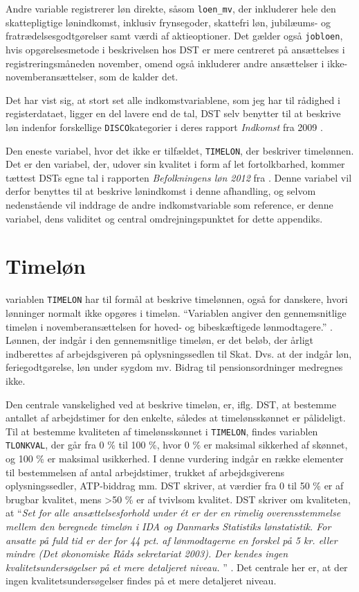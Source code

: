 Andre variable registrerer løn direkte, såsom \texttt{loen\_mv}, der inkluderer hele den skattepligtige lønindkomst, inklusiv frynsegoder, skattefri løn, jubilæums- og fratrædelsesgodtgørelser samt værdi af aktieoptioner. Det gælder også \texttt{jobloen}, hvis opgørelsesmetode i beskrivelsen hos DST er mere centreret på ansættelses i registreringsmåneden november, omend også inkluderer andre ansættelser i ikke-novemberansættelser, som de kalder det. \label{indkomstvariable}

Det har vist sig, at stort set alle indkomstvariablene, som jeg har til rådighed i registerdataet, ligger en del lavere end de tal, DST selv benytter til at beskrive løn indenfor forskellige \texttt{DISCO}kategorier i deres rapport \emph{Indkomst} fra 2009  \textcite{DST2009}.  

Den eneste variabel, hvor det ikke er tilfældet, \texttt{TIMELON}, der beskriver timelønnen. Det er den variabel, der, udover sin kvalitet i form af let fortolkbarhed, kommer tættest DSTs egne tal i rapporten \emph{Befolkningens løn 2012}  fra \citeyear{DST2012b}. Denne variabel vil derfor benyttes til at beskrive lønindkomst i denne afhandling, og selvom nedenstående vil inddrage de andre indkomstvariable som reference, er denne variabel, dens validitet og central omdrejningspunktet for dette appendiks. 

\section{Timeløn \label{}}

variablen \texttt{TIMELON} har til formål at beskrive timelønnen, også for danskere, hvori lønninger normalt ikke opgøres i timeløn. “Variablen angiver den gennemsnitlige timeløn i novemberansættelsen for hoved- og bibeskæftigede lønmodtagere.” \parencite{DST-TIMELON}. Lønnen, der indgår i den gennemsnitlige timeløn, er det beløb, der årligt indberettes af arbejdsgiveren på oplysningssedlen til Skat. Dvs. at der indgår løn, feriegodtgørelse, løn under sygdom mv. Bidrag til pensionsordninger medregnes ikke. 

Den centrale vanskelighed ved at beskrive timeløn, er, iflg. DST, at bestemme antallet af arbejdstimer for den enkelte, således at timelønsskønnet er pålideligt. Til at bestemme kvaliteten af timelønsskønnet i \texttt{TIMELON}, findes variablen \texttt{TLONKVAL}, der går fra 0 \% til 100 \%, hvor 0 \% er maksimal sikkerhed af skønnet, og 100 \% er maksimal usikkerhed. I denne vurdering indgår en række elementer til bestemmelsen af antal arbejdstimer, trukket af arbejdsgiverens oplysningssedler, ATP-biddrag mm. DST skriver, at værdier fra 0 til 50 \% er af brugbar kvalitet, mens >50 \% er af tvivlsom kvalitet. DST skriver om kvaliteten, at “\emph{Set for alle ansættelsesforhold under ét er der en rimelig overensstemmelse mellem den beregnede timeløn i IDA og Danmarks Statistiks lønstatistik. For ansatte på fuld tid er der for 44 pct. af lønmodtagerne en forskel på 5 kr. eller mindre (Det økonomiske Råds sekretariat 2003). Der kendes ingen kvalitetsundersøgelser på et mere detaljeret niveau. }” \parencite{DST-TIMELON}. Det centrale her er, at der ingen kvalitetsundersøgelser findes på et mere detaljeret niveau. 

